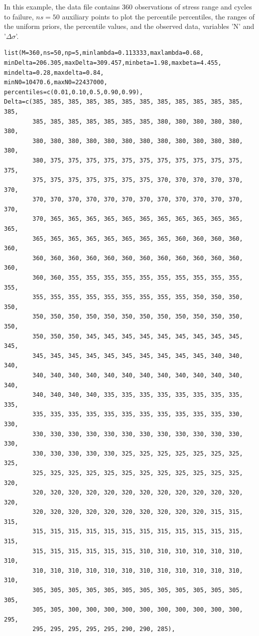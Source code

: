 In this example, the data file contains 360 observations of stress range and cycles to failure, $ns=50$ auxiliary points to plot the percentile percentiles, the  ranges of the uniform priors, the percentile values, and the observed data, variables 'N' and '$\Delta \sigma$'.
\begin{codebox}
\begin{verbatim}
list(M=360,ns=50,np=5,minlambda=0.113333,maxlambda=0.68,
minDelta=206.305,maxDelta=309.457,minbeta=1.98,maxbeta=4.455,
mindelta=0.28,maxdelta=0.84,
minN0=10470.6,maxN0=22437000,
percentiles=c(0.01,0.10,0.5,0.90,0.99),
Delta=c(385, 385, 385, 385, 385, 385, 385, 385, 385, 385, 385, 385, 385,
        385, 385, 385, 385, 385, 385, 385, 380, 380, 380, 380, 380, 380,
        380, 380, 380, 380, 380, 380, 380, 380, 380, 380, 380, 380, 380,
        380, 375, 375, 375, 375, 375, 375, 375, 375, 375, 375, 375, 375,
        375, 375, 375, 375, 375, 375, 375, 370, 370, 370, 370, 370, 370,
        370, 370, 370, 370, 370, 370, 370, 370, 370, 370, 370, 370, 370,
        370, 365, 365, 365, 365, 365, 365, 365, 365, 365, 365, 365, 365,
        365, 365, 365, 365, 365, 365, 365, 365, 360, 360, 360, 360, 360,
        360, 360, 360, 360, 360, 360, 360, 360, 360, 360, 360, 360, 360,
        360, 360, 355, 355, 355, 355, 355, 355, 355, 355, 355, 355, 355,
        355, 355, 355, 355, 355, 355, 355, 355, 355, 350, 350, 350, 350,
        350, 350, 350, 350, 350, 350, 350, 350, 350, 350, 350, 350, 350,
        350, 350, 350, 345, 345, 345, 345, 345, 345, 345, 345, 345, 345,
        345, 345, 345, 345, 345, 345, 345, 345, 345, 345, 340, 340, 340,
        340, 340, 340, 340, 340, 340, 340, 340, 340, 340, 340, 340, 340,
        340, 340, 340, 340, 335, 335, 335, 335, 335, 335, 335, 335, 335,
        335, 335, 335, 335, 335, 335, 335, 335, 335, 335, 335, 330, 330,
        330, 330, 330, 330, 330, 330, 330, 330, 330, 330, 330, 330, 330,
        330, 330, 330, 330, 330, 325, 325, 325, 325, 325, 325, 325, 325,
        325, 325, 325, 325, 325, 325, 325, 325, 325, 325, 325, 325, 320,
        320, 320, 320, 320, 320, 320, 320, 320, 320, 320, 320, 320, 320,
        320, 320, 320, 320, 320, 320, 320, 320, 320, 320, 315, 315, 315,
        315, 315, 315, 315, 315, 315, 315, 315, 315, 315, 315, 315, 315,
        315, 315, 315, 315, 315, 315, 310, 310, 310, 310, 310, 310, 310,
        310, 310, 310, 310, 310, 310, 310, 310, 310, 310, 310, 310, 310,
        305, 305, 305, 305, 305, 305, 305, 305, 305, 305, 305, 305, 305,
        305, 305, 300, 300, 300, 300, 300, 300, 300, 300, 300, 300, 295,
        295, 295, 295, 295, 295, 290, 290, 285),

\end{verbatim}
\end{codebox}
